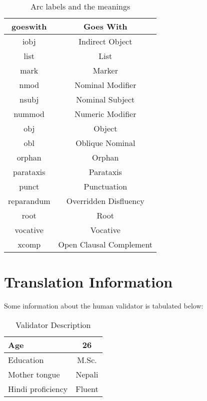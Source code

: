 \begin{table}[ht]
\begin{center}
{\begin{tabular}{|c|c|}
            \hline
            goeswith & Goes With \\
            \hline
            iobj & Indirect Object \\
            \hline
            list & List \\
            \hline
            mark & Marker \\
            \hline
            nmod & Nominal Modifier \\
            \hline
            nsubj & Nominal Subject \\
            \hline
            nummod & Numeric Modifier \\
            \hline
            obj & Object \\
            \hline
            obl & Oblique Nominal \\
            \hline
            orphan & Orphan \\
            \hline
            parataxis & Parataxis \\
            \hline
            punct & Punctuation \\
            \hline
            reparandum & Overridden Disfluency \\
            \hline
            root & Root \\
            \hline
            vocative & Vocative \\
            \hline
            xcomp & Open Clausal Complement \\
            \hline
        \end{tabular}
        }
        \caption{Arc labels and the meanings}
        \label{table:label_meanings}
    \end{center}
\end{table}

\section{Translation Information} \label{translation}
Some information about the human validator is tabulated below:
\begin{table}[ht]
    \begin{center}
        \begin{tabular}{|l|c|}
            \hline
            Age & 26 \\
            \hline
            Education & M.Sc. \\
            \hline
            Mother tongue & Nepali \\
            \hline
            Hindi proficiency & Fluent \\
            \hline
        \end{tabular}
        \caption{Validator Description}
        \label{table:validator_description}
    \end{center}
\end{table}

